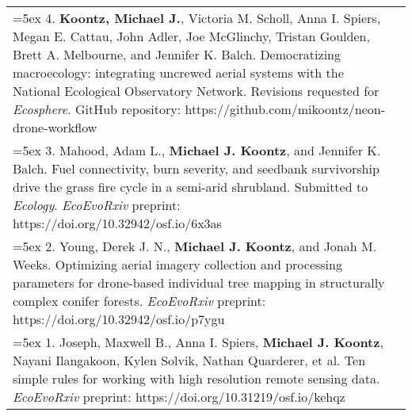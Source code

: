 \begin{longtable}{@{} >{\raggedright}p{6.10in} >{\raggedleft}X @{}}

\hangindent=5ex 4. \textbf{Koontz, Michael J.}, Victoria M. Scholl, Anna I. Spiers, Megan E. Cattau, John Adler, Joe McGlinchy, Tristan Goulden, Brett A. Melbourne, and Jennifer K. Balch. Democratizing macroecology: integrating uncrewed aerial systems with the National Ecological Observatory Network. Revisions requested for \emph{Ecosphere}. 
\newline GitHub repository: https://github.com/mikoontz/neon-drone-workflow & \tabularnewline

\hangindent=5ex 3. Mahood, Adam L., \textbf{Michael J. Koontz}, and Jennifer K. Balch. Fuel connectivity, burn severity, and seedbank survivorship drive the grass fire cycle in a semi-arid shrubland. Submitted to \emph{Ecology}. 
\newline \emph{EcoEvoRxiv} preprint: https://doi.org/10.32942/osf.io/6x3as & \tabularnewline

\hangindent=5ex 2. Young, Derek J. N., \textbf{Michael J. Koontz}, and Jonah M. Weeks. Optimizing aerial imagery collection and processing parameters for drone-based individual tree mapping in structurally complex conifer forests. 
\newline \emph{EcoEvoRxiv} preprint: https://doi.org/10.32942/osf.io/p7ygu & \tabularnewline

\hangindent=5ex 1. Joseph, Maxwell B., Anna I. Spiers, \textbf{Michael J. Koontz}, Nayani Ilangakoon, Kylen Solvik, Nathan Quarderer, et al. Ten simple rules for working with high resolution remote sensing data.
\newline \emph{EcoEvoRxiv} preprint: https://doi.org/10.31219/osf.io/kehqz & \tabularnewline


\end{longtable}
